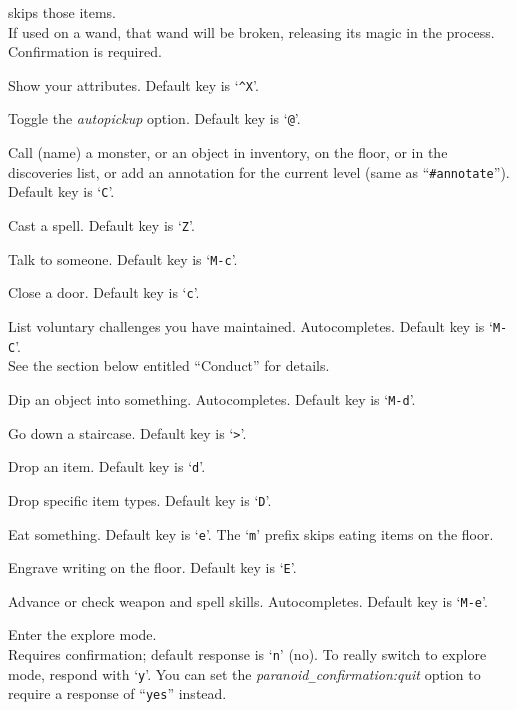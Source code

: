 skips those items.\\
If used on a wand, that wand will be broken, releasing its magic in the
process.  Confirmation is required.
\item[\tb{\#attributes}]
Show your attributes. Default key is `{\tt \^{}X}'.
\item[\tb{\#autopickup}]
Toggle the {\it autopickup\/} option. Default key is `{\tt @}'.
\item[\tb{\#call}]
Call (name) a monster, or an object in inventory, on the floor,
or in the discoveries list, or add an annotation for the
current level (same as ``{\tt \#annotate}''). Default key is `{\tt C}'.
\item[\tb{\#cast}]
Cast a spell. Default key is `{\tt Z}'.
\item[\tb{\#chat}]
Talk to someone. Default key is `{\tt M-c}'.
\item[\tb{\#close}]
Close a door. Default key is `{\tt c}'.
\item[\tb{\#conduct}]
List voluntary challenges you have maintained. Autocompletes.
Default key is `{\tt M-C}'.\\
See the section below entitled ``Conduct'' for details.
\item[\tb{\#dip}]
Dip an object into something. Autocompletes. Default key is `{\tt M-d}'.
\item[\tb{\#down}]
Go down a staircase. Default key is `{\tt >}'.
\item[\tb{\#drop}]
Drop an item. Default key is `{\tt d}'.
\item[\tb{\#droptype}]
Drop specific item types. Default key is `{\tt D}'.
\item[\tb{\#eat}]
Eat something. Default key is `{\tt e}'.
The `{\tt m}' prefix skips eating items on the floor.
\item[\tb{\#engrave}]
Engrave writing on the floor. Default key is `{\tt E}'.
\item[\tb{\#enhance}]
Advance or check weapon and spell skills. Autocompletes.
Default key is `{\tt M-e}'.
\item[\tb{\#exploremode}]
Enter the explore mode.\\
Requires confirmation; default response is `{\tt n}' (no).
To really switch to explore mode, respond with `{\tt y}'.
You can set the
{\it paranoid\verb+_+confirmation:quit\/}
option to require a response of ``{\tt yes}'' instead.
\item[\tb{\#fire}]
